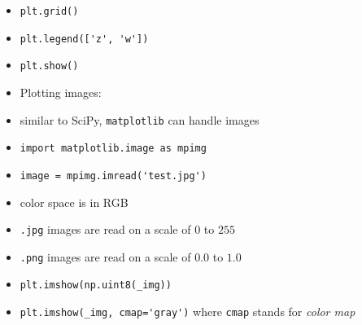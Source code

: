 \documentclass[onecolumn]{IEEEtran} %
\begin{document}
\begin{itemize}
        \item \verb|plt.grid()|
        \item \verb|plt.legend(['z', 'w'])|
        \item \verb|plt.show()|
    \ei
    \item Plotting images:
    \bi
        \item similar to SciPy, \verb|matplotlib| can handle images
        \item \verb|import matplotlib.image as mpimg|
        \item \verb|image = mpimg.imread('test.jpg')|
        \bi
            \item color space is in RGB
            \item \verb|.jpg| images are read on a scale of $0$ to $255$
            \item \verb|.png| images are read on a scale of $0.0$ to $1.0$
        \ei
        \item \verb|plt.imshow(np.uint8(_img))|
        \item \verb|plt.imshow(_img, cmap='gray')|
        \newline where \verb|cmap| stands for \emph{color map}
    \ei
\end{itemize}

\newpage
\end{document}
